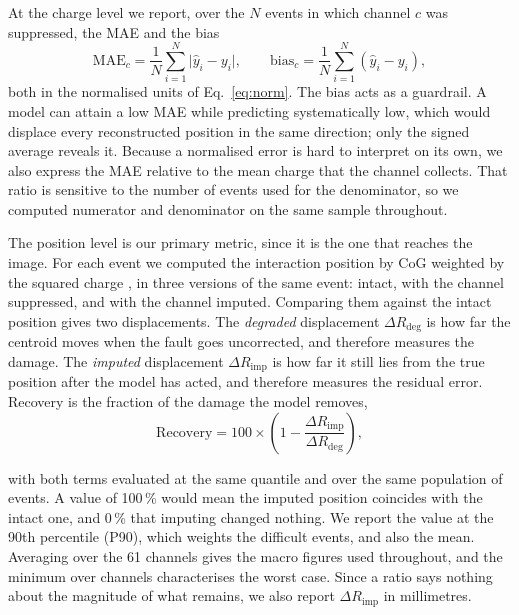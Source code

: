 \documentclass[10pt,conference]{IEEEtran}
\begin{document}
At the charge level we report, over the $N$ events in which channel $c$ was
suppressed, the MAE and the bias
%
\begin{equation}
\mathrm{MAE}_{c} = \frac{1}{N} \sum_{i=1}^{N} \lvert \hat{y}_{i} - y_{i} \rvert,
\qquad
\mathrm{bias}_{c} = \frac{1}{N} \sum_{i=1}^{N} (\hat{y}_{i} - y_{i}),
\label{eq:mae}
\end{equation}
%
both in the normalised units of Eq.~\ref{eq:norm}. The bias acts as a
guardrail. A model can attain a low MAE while predicting systematically low,
which would displace every reconstructed position in the same direction; only
the signed average reveals it. Because a normalised error is hard to interpret
on its own, we also express the MAE relative to the mean charge that the
channel collects. That ratio is sensitive to the number of events used for the
denominator, so we computed numerator and denominator on the same sample
throughout.

The position level is our primary metric, since it is the one that reaches the
image. For each event we computed the interaction position by CoG weighted by
the squared charge \cite{anger1958, poladyan2020}, in three versions of the
same event: intact, with the channel suppressed, and with the channel imputed.
Comparing them against the intact position gives two displacements. The
\emph{degraded} displacement $\Delta R_{\mathrm{deg}}$ is how far the centroid
moves when the fault goes uncorrected, and therefore measures the damage. The
\emph{imputed} displacement $\Delta R_{\mathrm{imp}}$ is how far it still lies
from the true position after the model has acted, and therefore measures the
residual error. Recovery is the fraction of the damage the model removes,
%
\begin{equation}
\mathrm{Recovery} = 100 \times
  \left( 1 - \frac{\Delta R_{\mathrm{imp}}}{\Delta R_{\mathrm{deg}}} \right),
\label{eq:recovery}
\end{equation}

with both terms evaluated at the same quantile and over the same population of
events. A value of 100\,\% would mean the imputed position coincides with the
intact one, and 0\,\% that imputing changed nothing. We report the value at the
90th percentile (P90), which weights the difficult events, and also the mean.
Averaging over the 61 channels gives the macro figures used throughout, and the
minimum over channels characterises the worst case. Since a ratio says nothing
about the magnitude of what remains, we also report
$\Delta R_{\mathrm{imp}}$ in millimetres.
\end{document}

